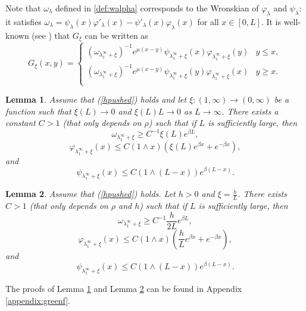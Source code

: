 \documentclass[11pt]{article}
\theoremstyle{plain}
\newtheorem{lemma}{Lemma}[section]
\newcommand\linf{\lambda_1^\infty}
\begin{document}
Note that $\omega_\lambda$ defined in \eqref{def:walpha} corresponds to the Wronskian of $\varphi_\lambda$ and $\psi_\lambda$: it satisfies $\omega_\lambda=\psi_{\lambda}(x)\varphi'_{\lambda}(x)-\psi'_{\lambda}(x)\varphi_{\lambda}(x)$ for all $x\in[0,L]$. It is well-known (see \cite[Chapter II]{Borodin:2012aa}) that  $G_\xi$ can be written as 
  \begin{equation}
    G_{\xi}(x,y)=\begin{cases}
(\omega_{{\linf+\xi}})^{-1}e^{\mu(x-y)}\psi_{{\linf+\xi}}(x)\varphi_{{\linf+\xi}}(y)  &  y\leqslant x,\\
(\omega_{{\linf+\xi}})^{-1}e^{\mu(x-y)}\psi_{{\linf+\xi}}(y)\varphi_{{\linf+\xi}}(x) &  y\geqslant x.\\
    \end{cases}
    \label{greenfun}
\end{equation}


\begin{lemma} Assume that (\ref{hpushed}) holds and let $\xi:(1,\infty)\rightarrow(0,\infty)$ \label{lem:alphat} be a function such that $\xi(L)\to 0$ and $\xi(L)L\to 0$ as $L\to\infty$.
There exists a constant $C>1$ (that only depends on $\rho$) such that if $L$ is sufficiently large, then 
\begin{equation*}
\omega_{\linf+\xi} \geqslant C^{-1}\xi(L)e^{\beta L},
\end{equation*}
\begin{equation*}
\varphi_{\linf+\xi}(x)\leqslant C(1\wedge x)\left(\xi(L) e^{\beta x}+e^{-\beta x}\right),
\end{equation*}
and
\begin{equation*}
\psi_{\linf+\xi}(x)\leqslant C(1\wedge(L-x))e^{\beta (L-x)}.
\end{equation*}
\end{lemma}

\begin{lemma} \label{lemma:wro} Assume that (\ref{hpushed}) holds. Let $h>0$ and $\xi=\frac{h}{L}$. There exists $C>1$ (that only depends on $\rho$ and $h$) such that if $L$ is sufficiently large, then 
\begin{equation*}
\omega_{\linf+\xi}\geqslant
C^{-1}\frac{h}{2L}e^{\beta L},
\end{equation*}
\begin{equation*}
\varphi_{\linf+\xi}(x)\leqslant C(1\wedge x)\left(\frac{h}{L} e^{\beta x}+e^{-\beta x}\right),
\end{equation*}
and
\begin{equation*}
\psi_{\linf+\xi}(x)\leqslant C(1\wedge(L-x))e^{\beta (L-x)}.
\end{equation*}
\end{lemma}
 The proofs of Lemma \ref{lem:alphat} and Lemma \ref{lemma:wro} can be found in Appendix \ref{appendix:greenf}.
\end{document}
